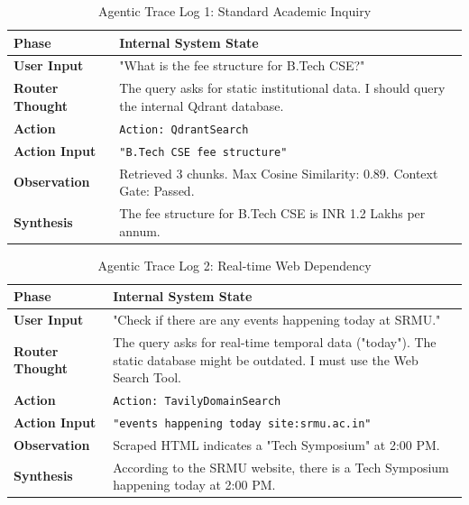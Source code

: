 \documentclass[12pt,a4paper]{report}
\begin{document}
\begin{table}[h!]
\centering
\caption{Agentic Trace Log 1: Standard Academic Inquiry}
\begin{tabularx}{\textwidth}{|l|X|}
\hline
\textbf{Phase} & \textbf{Internal System State} \\ \hline
\textbf{User Input} & "What is the fee structure for B.Tech CSE?" \\ \hline
\textbf{Router Thought} & The query asks for static institutional data. I should query the internal Qdrant database. \\ \hline
\textbf{Action} & \texttt{Action: QdrantSearch} \\ \hline
\textbf{Action Input} & \texttt{"B.Tech CSE fee structure"} \\ \hline
\textbf{Observation} & Retrieved 3 chunks. Max Cosine Similarity: 0.89. Context Gate: Passed. \\ \hline
\textbf{Synthesis} & The fee structure for B.Tech CSE is INR 1.2 Lakhs per annum. \\ \hline
\end{tabularx}
\end{table}

\begin{table}[h!]
\centering
\caption{Agentic Trace Log 2: Real-time Web Dependency}
\begin{tabularx}{\textwidth}{|l|X|}
\hline
\textbf{Phase} & \textbf{Internal System State} \\ \hline
\textbf{User Input} & "Check if there are any events happening today at SRMU." \\ \hline
\textbf{Router Thought} & The query asks for real-time temporal data ("today"). The static database might be outdated. I must use the Web Search Tool. \\ \hline
\textbf{Action} & \texttt{Action: TavilyDomainSearch} \\ \hline
\textbf{Action Input} & \texttt{"events happening today site:srmu.ac.in"} \\ \hline
\textbf{Observation} & Scraped HTML indicates a "Tech Symposium" at 2:00 PM. \\ \hline
\textbf{Synthesis} & According to the SRMU website, there is a Tech Symposium happening today at 2:00 PM. \\ \hline
\end{tabularx}
\end{table}
\end{document}
